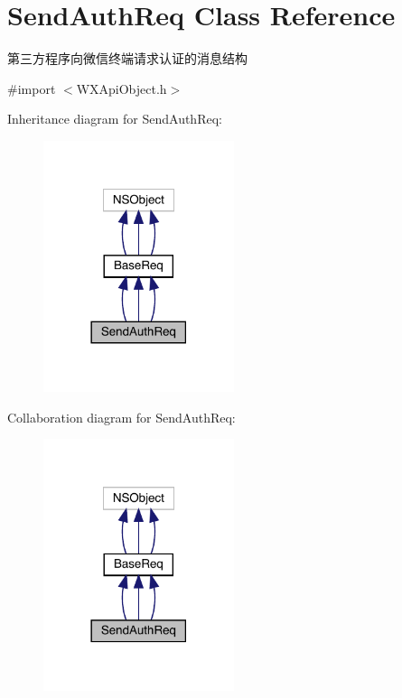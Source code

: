 \hypertarget{interface_send_auth_req}{}\section{Send\+Auth\+Req Class Reference}
\label{interface_send_auth_req}


第三方程序向微信终端请求认证的消息结构  




{\ttfamily \#import $<$W\+X\+Api\+Object.\+h$>$}



Inheritance diagram for Send\+Auth\+Req\+:\nopagebreak
\begin{figure}[H]
\begin{center}
\leavevmode
\includegraphics[width=158pt]{interface_send_auth_req__inherit__graph}
\end{center}
\end{figure}


Collaboration diagram for Send\+Auth\+Req\+:\nopagebreak
\begin{figure}[H]
\begin{center}
\leavevmode
\includegraphics[width=158pt]{interface_send_auth_req__coll__graph}
\end{center}
\end{figure}
